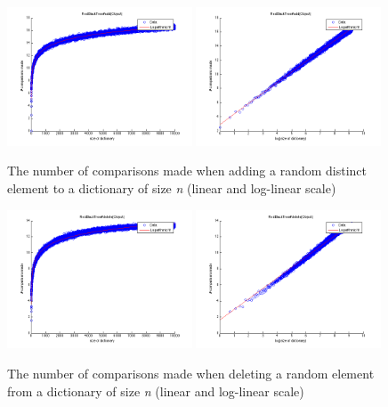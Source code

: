\begin{figure}[!htbpp]
    \centering
    \includegraphics[width=0.49\textwidth]{resources/add}
    \includegraphics[width=0.49\textwidth]{resources/add_log}
    \caption{The number of comparisons made when adding a random distinct element to a dictionary of size \textit{n} (linear and log-linear scale)}

\end{figure}

\begin{figure}[!htbp]
    \centering
    \includegraphics[width=0.49\textwidth]{resources/del}
    \includegraphics[width=0.49\textwidth]{resources/del_log}
    \caption{The number of comparisons made when deleting a random element from a dictionary of size \textit{n} (linear and log-linear scale)}
\end{figure}


